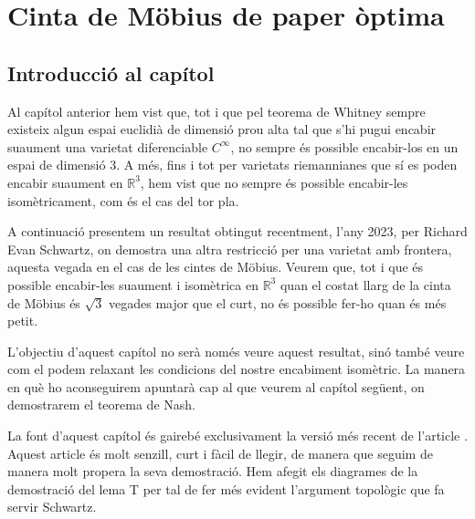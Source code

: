 \chapter{Cinta de Möbius de paper òptima}
\section{Introducció al capítol}
Al capítol anterior hem vist que, tot i que pel teorema de Whitney sempre existeix algun espai euclidià de dimensió prou alta tal que s'hi pugui encabir suaument una varietat diferenciable $C^\infty$, no sempre és possible encabir-los en un espai de dimensió 3. A més, fins i tot per varietats riemannianes que sí es poden encabir suaument en $\mathbb R^3$, hem vist que no sempre és possible encabir-les isomètricament, com és el cas del tor pla. 

A continuació presentem un resultat obtingut recentment, l'any 2023, per Richard Evan Schwartz, on demostra una altra restricció per una varietat amb frontera, aquesta vegada en el cas de les cintes de Möbius. Veurem que, tot i que és possible encabir-les suaument i isomètrica en $\mathbb R^3$ quan el costat llarg de la cinta de Möbius és $\sqrt3$ vegades major que el curt, no és possible fer-ho quan és més petit. 

L'objectiu d'aquest capítol no serà només veure aquest resultat, sinó també veure com el podem  relaxant les condicions del nostre encabiment isomètric. La manera en què ho aconseguirem apuntarà cap al que veurem al capítol següent, on demostrarem el teorema de Nash. 

La font d'aquest capítol és gairebé exclusivament la versió més recent de l'article \cite{schwartz2024}. Aquest article és molt senzill, curt i fàcil de llegir, de manera que seguim de manera molt propera la seva demostració. Hem afegit els diagrames de la demostració del lema T per tal de fer més evident l'argument topològic que fa servir Schwartz.


